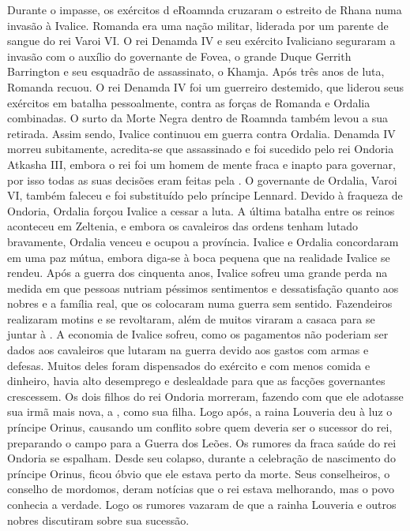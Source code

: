 Durante o impasse, os exércitos d eRoamnda cruzaram o estreito de Rhana numa invasão à Ivalice.
Romanda era uma nação militar, liderada por um parente de sangue do rei Varoi VI. 
O rei Denamda IV e seu exército Ivaliciano seguraram a invasão com o auxílio do governante de Fovea, o grande Duque Gerrith Barrington e seu esquadrão de assassinato, o Khamja.
Após três anos de luta, Romanda recuou.
O rei Denamda IV foi um guerreiro destemido, que liderou seus exércitos em batalha pessoalmente, contra as forças de Romanda e Ordalia combinadas.
O surto da Morte Negra dentro de Roamnda também levou a sua retirada. Assim sendo, Ivalice continuou em guerra contra Ordalia.
Denamda IV morreu subitamente, acredita-se que assassinado e foi sucedido pelo rei Ondoria Atkasha III, embora o rei foi um homem de mente fraca e inapto para governar, por isso todas as suas decisões eram feitas pela .
O governante de Ordalia, Varoi VI, também faleceu e foi substituído pelo príncipe Lennard.
Devido à fraqueza de Ondoria, Ordalia forçou Ivalice a cessar a luta.
A última batalha entre os reinos aconteceu em Zeltenia, e embora os cavaleiros das ordens tenham lutado bravamente, Ordalia venceu e ocupou a província.
Ivalice e Ordalia concordaram em uma paz mútua, embora diga-se à boca pequena que na realidade Ivalice se rendeu.
Após a guerra dos cinquenta anos, Ivalice sofreu uma grande perda na medida em que pessoas nutriam péssimos sentimentos e dessatisfação quanto aos nobres e a família real, que os colocaram numa guerra sem sentido.
Fazendeiros realizaram motins e se revoltaram, além de muitos viraram a casaca para se juntar à .
A economia de Ivalice sofreu, como os pagamentos não poderiam ser dados aos cavaleiros que lutaram na guerra devido aos gastos com armas e defesas.
Muitos deles foram dispensados do exército e com menos comida e dinheiro, havia alto desemprego e deslealdade para que as facções governantes crescessem.
Os dois filhos do rei Ondoria morreram, fazendo com que ele adotasse sua irmã mais nova, a , como sua filha.
Logo após, a raina Louveria deu à luz o príncipe Orinus, causando um conflito sobre quem deveria ser o sucessor do rei, preparando o campo para a Guerra dos Leões.
Os rumores da fraca saúde do rei Ondoria se espalham.
Desde seu colapso, durante a celebração de nascimento do príncipe Orinus, ficou óbvio que ele estava perto da morte.
Seus conselheiros, o conselho de mordomos, deram notícias que o rei estava melhorando, mas o povo conhecia a verdade. Logo os rumores vazaram de que a rainha Louveria e outros nobres discutiram sobre sua sucessão.
